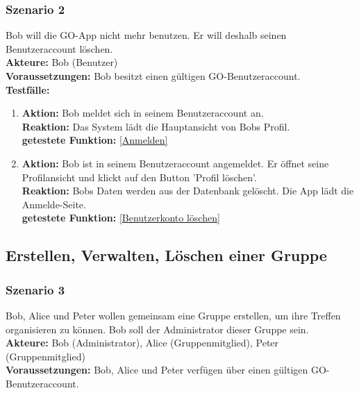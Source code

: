 \documentclass[parskip=full]{scrartcl}
\def\threedigits#1{%
  \ifnum#1<100 0\fi
  \ifnum#1<10 0\fi
  \number#1}
\begin{document}
\subsubsection*{Szenario 2}Bob will die GO-App nicht mehr benutzen. Er will deshalb seinen Benutzeraccount löschen. \\

\textbf{Akteure:} Bob (Benutzer) \\

\textbf{Voraussetzungen: }Bob besitzt einen gültigen GO-Benutzeraccount.\\

\textbf{Testfälle:}
\begin{enumerate}[label={\textbf{/T\protect\threedigits{\theenumi}0/}}, leftmargin=*, resume]
	\item \textbf{Aktion:} Bob meldet sich in seinem Benutzeraccount an. \\
	\textbf{Reaktion:} Das System lädt die Hauptansicht von Bobs Profil.\\
	\textbf{getestete Funktion:} \ref{Anmelden}
	\item \textbf{Aktion:} Bob ist in seinem Benutzeraccount angemeldet. Er öffnet seine Profilansicht und klickt auf den Button 'Profil löschen'.\\
	\textbf{Reaktion:} Bobs Daten werden aus der Datenbank gelöscht. Die App lädt die Anmelde-Seite.\\
	\textbf{getestete Funktion:} \ref{Benutzerkonto löschen}
\end{enumerate}

\subsection{Erstellen, Verwalten, Löschen einer Gruppe}

\subsubsection*{Szenario 3} Bob, Alice und Peter wollen gemeinsam eine Gruppe erstellen, um ihre Treffen organisieren zu können. Bob soll der Administrator dieser Gruppe sein.\\

\textbf{Akteure:} Bob (Administrator), Alice (Gruppenmitglied), Peter (Gruppenmitglied) \\

\textbf{Voraussetzungen:} Bob, Alice und Peter verfügen über einen gültigen GO-Benutzeraccount.\\
\end{document}
